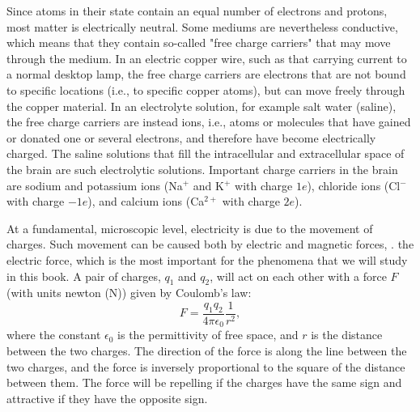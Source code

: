 Since atoms in their  state contain an equal number of electrons and protons, most matter is electrically neutral. Some mediums are nevertheless conductive, which means that they contain so-called "free charge carriers" that may move through the medium. In an electric copper wire, such as that carrying current to a normal desktop lamp, the free charge carriers are electrons that are not bound to specific locations (i.e., to specific copper atoms), but can move freely through the copper material. In an electrolyte solution, for example salt water (saline), the free charge carriers are instead ions, i.e., atoms or molecules that have gained or donated one or several electrons, and therefore have become electrically charged. The saline solutions that fill the intracellular and extracellular space of the brain are such electrolytic solutions. Important charge carriers in the brain are sodium and potassium ions (Na$^+$ and K$^+$ with charge $1e$), chloride ions (Cl$^-$ with charge $-1e$), and calcium ions (Ca$^{2+}$ with charge $2e$).

At a fundamental, microscopic level, electricity is due to the movement of charges. Such movement can be caused both by electric and magnetic forces, .  the electric force, which is the most important for the phenomena that we will study in this book. A pair of charges, $q_1$ and $q_2$, will act on each other with a force $F$ (with units newton (\si{\newton})) given by Coulomb's law:
\begin{equation}
F = \frac{q_1q_2}{4\pi \epsilon_0} \frac{1}{r^2},
\label{eq:Basics:CoulombF}
\end{equation}
where the constant $\epsilon_0$ is the permittivity of free space, and $r$ is the distance between the two charges. The direction of the  force  is along the line between the two charges, and the force is inversely proportional to the square of the distance between them.  The force will be repelling if the charges have the same sign and attractive if they have the opposite sign. 

